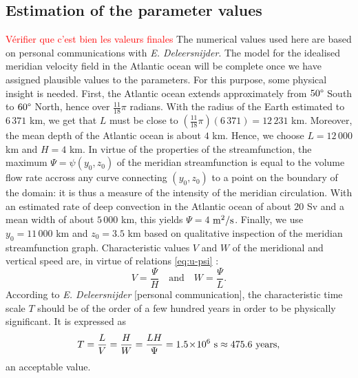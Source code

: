 \subsection{Estimation of the parameter values}
\textcolor{red}{Vérifier que c'est bien les valeurs finales}
The numerical values used here are based on personal communications with \textit{E. Deleersnijder}.
The model for the idealised meridian velocity field in the Atlantic ocean will be complete once we have assigned plausible values to the parameters. For this purpose, some physical insight is needed. First, the Atlantic ocean extends approximately from $50\degree$ South to $60\degree$ North, hence over $\frac{11}{18}\pi$ radians. With the radius of the Earth estimated to $6\,371$ km, we get that $L$ must be close to $(\frac{11}{18}\pi) (6\,371) = 12\, 231$ km. Moreover, the mean depth of the Atlantic ocean is about $4$ km. Hence, we choose $L = 12\,000$ km and $H = 4$ km. In virtue of the properties of the streamfunction, the maximum $\Psi = \psi(y_0,z_0)$ of the meridian streamfunction is equal to the volume flow rate accross any curve connecting $(y_0,z_0)$ to a point on the boundary of the domain: it is thus a measure of the intensity of the meridian circulation. With an estimated rate of deep convection in the Atlantic ocean of about $20$ Sv and a mean width of about $5\,000$ km, this yields $\Psi = 4$ $\rm{m^2/s}$. Finally, we use $y_0 = 11\,000$ km and $z_0 = 3.5$ km based on qualitative inspection of the meridian streamfunction graph. Characteristic values $V$ and $W$ of the meridional and vertical speed are, in virtue of relations \eqref{eq:u-psi} :
\begin{equation}\label{eq:VW}
	V = \frac{\Psi}{H} \quad \mbox{and} \quad W = \frac{\Psi}{L}.
\end{equation}
According to \textit{E. Deleersnijder} [personal communication], the characteristic time scale $T$ should be of the order of a few hundred years in order to be physically significant. It is expressed as
\begin{equation} \label{eq:T}
	T = \frac{L}{V} = \frac{H}{W} = \frac{LH}{\Psi} = 1.5\e{6} \mbox{ s} \approx 475.6 \mbox{ years},
\end{equation}
an acceptable value.


